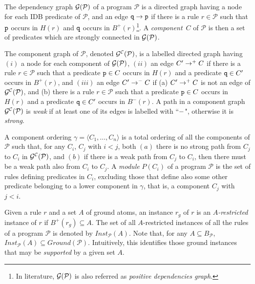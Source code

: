 \documentclass{tlp}
\newcommand{\nop}[1]{}
\newcommand{\p}{\ensuremath{{\mathcal{P}}}}
\newcommand{\GP}{\ensuremath{Ground(\p)}}
\newcommand{\BP}{\ensuremath{B_{\p}}}
\newcommand{\R}{\ensuremath{r}}
\newcommand{\HR}{\ensuremath{H(\R)}}
\newcommand{\posbody}[1]{\ensuremath{B^+(#1)}}
\newcommand{\negbody}[1]{\ensuremath{B^-(#1)}}
\newcommand{\dquo}[1]{``#1"}
\begin{document}
The dependency graph ${\cal G}(\p)$ of a program $\p$
is a directed graph having a node for each
IDB predicate of $\p$, and an edge $\tt q \rightarrow p$ if 
there is a rule $\R \in \p$ such that $\tt p$ occurs in $\HR$ and 
$\tt q$ occurs in $\posbody{\R}$\footnote{
In literature, ${\cal G}(\p)$ is also referred as {\em positive dependencies graph}.}.
A {\em component} $\,C$ of $\p$ is then a set of predicates which are strongly 
connected in ${\cal G}(\p)$.

The component graph of $\p$, denoted ${\cal G^C}(\p)$, is a labelled
directed graph having $(i)$ a node for each component of ${\cal G}(\p)$,
$(ii)$ an edge $C' \rightarrow^{\tt +} C$ if
there is a rule $\R \in \p$ such that a predicate ${\tt p} \in
C$ occurs in $\HR$ and a predicate ${\tt q} \in C'$
occurs in $\posbody{\R}$,
and $(iii)$ an edge $C' \rightarrow^{\tt -} C$ if (a) $C' \rightarrow^{\tt +} C$
is not an edge of ${\cal G^C}(\p)$, and (b)
there is a rule $\R \in \p$ such that a predicate ${\tt p} \in
C$ occurs in $\HR$ and a predicate ${\tt q} \in C'$
occurs in $\negbody{\R}$.
A path in a component graph ${\cal G^C}(\p)$ is {\em weak} if at least one of 
its edges is labelled with \dquo{$\tt -$}, otherwise it is {\em strong}.

A component ordering $\gamma = \langle C_1, \dots, C_n \rangle$ is a total 
ordering of all the components of $\p$ such that, for any $C_i$, $C_j$ with $i < j$, 
both $(a)$ there is no strong path from $C_j$ to $C_i$ in ${\cal G^C}(\p)$,
and $(b)$ if there is a weak path from $C_j$ to $C_i$, then there must be
a weak path also from $C_i$ to $C_j$.
A {\em module} $P(C_i)$ of a program $\p$ is the set of rules
defining predicates in $C_i$, excluding those
that define also some other predicate belonging to a lower
component in $\gamma$, that is, a component $C_j$ with $j < i$.

Given a rule $\R$ and a set $A$
of ground atoms, an instance $\R_g$ of $\R$
is an {\em $A$-restricted} instance of $\R$ if $\posbody{\R_g} \subseteq A$. 
The set of all $A$-restricted instances of all the rules of a program $\p$ is denoted
by $Inst_\p(A)$.
Note that, for any $A \subseteq \BP$, $Inst_\p(A) \subseteq
\GP$. Intuitively, this identifies those ground instances that may be
{\em supported} by a given set $A$.
\nop{Some further simplification to $\GP$ can be properly performed by
exploiting a modular evaluation of the program that relies on a
component ordering.}
\end{document}
